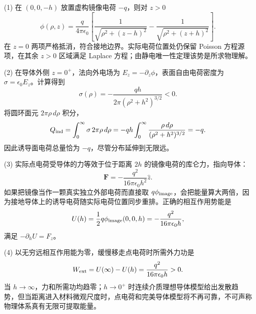 (1) 在 \((0,0,-h)\) 放置虚构镜像电荷 \(-q\)，则对 \(z>0\)
\[
\phi(\rho,z)=\frac{q}{4\pi\epsilon_0}\left[
\frac1{\sqrt{\rho^2+(z-h)^2}}-
\frac1{\sqrt{\rho^2+(z+h)^2}}\right].
\]
在 \(z=0\) 两项严格抵消，符合接地边界。实际电荷位置处仍保留 Poisson 方程源项，在其余 \(z>0\) 区域满足 Laplace 方程；由静电唯一性定理该势是所求物理解。

(2) 在导体外侧 \(z=0^+\)，法向外电场为 \(E_z=-\partial_z\phi\)，表面自由电荷密度为 \(\sigma=\epsilon_0E_z\)。计算得到
\[
\sigma(\rho)=-\frac{qh}{2\pi(\rho^2+h^2)^{3/2}}<0.
\]
将圆环面元 \(2\pi\rho\,d\rho\) 积分，
\[
Q_{\rm ind}=\int_0^\infty\sigma\,2\pi\rho\,d\rho
=-qh\int_0^\infty\frac{\rho\,d\rho}{(\rho^2+h^2)^{3/2}}
=-q.
\]
因此诱导面电荷总量恰为 \(-q\)，尽管分布延伸到无限远。

(3) 实际点电荷受导体的力等效于位于距离 \(2h\) 的镜像电荷的库仑力，指向导体：
\[
\boldsymbol F=-\frac{q^2}{16\pi\epsilon_0h^2}\hat z.
\]
如果把镜像当作一颗真实独立外部电荷而直接取 \(q\phi_{\rm image}\)，会把能量算大两倍，因为接地导体上的诱导电荷随实际电荷位置同步重排。正确的相互作用势能是
\[
U(h)=\frac12q\phi_{\rm image}(0,0,h)
=-\frac{q^2}{16\pi\epsilon_0h},
\]
满足 \(-\partial_hU=F_z\)。

(4) 以无穷远相互作用能为零，缓慢移走点电荷时所需外力功是
\[
W_{\rm ext}=U(\infty)-U(h)
=\frac{q^2}{16\pi\epsilon_0h}>0.
\]
当 \(h\to\infty\)，力和所需功均趋零；\(h\to0^+\) 时连续介质理想导体模型给出发散趋势，但当距离进入材料微观尺度时，点电荷和完美导体模型将不再可靠，不可声称物理体系真有无限可提取能量。

